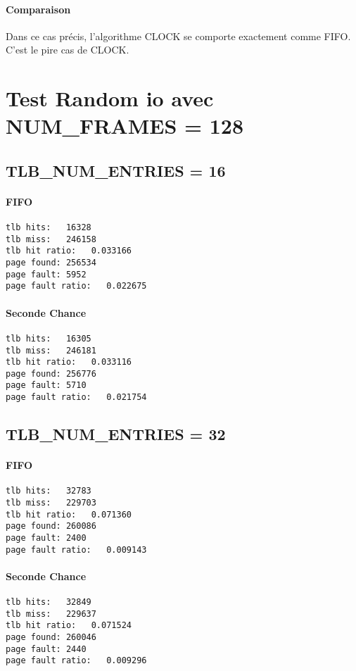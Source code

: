\documentclass{article}
\begin{document}
\paragraph{Comparaison}
Dans ce cas précis, l'algorithme CLOCK se comporte exactement comme FIFO.
C'est le pire cas de CLOCK.

\section*{Test Random io avec NUM\_FRAMES = 128}
\subsection*{TLB\_NUM\_ENTRIES = 16 }
\paragraph{FIFO}
\begin{lstlisting}
tlb hits:   16328
tlb miss:   246158
tlb hit ratio:   0.033166
page found: 256534
page fault: 5952
page fault ratio:   0.022675
\end{lstlisting}
\paragraph{Seconde Chance}
\begin{lstlisting}
tlb hits:   16305
tlb miss:   246181
tlb hit ratio:   0.033116
page found: 256776
page fault: 5710
page fault ratio:   0.021754
\end{lstlisting}

\subsection*{TLB\_NUM\_ENTRIES = 32}
\paragraph{FIFO}
\begin{lstlisting}
tlb hits:   32783
tlb miss:   229703
tlb hit ratio:   0.071360
page found: 260086
page fault: 2400
page fault ratio:   0.009143
\end{lstlisting}
\paragraph{Seconde Chance}
\begin{lstlisting}
tlb hits:   32849
tlb miss:   229637
tlb hit ratio:   0.071524
page found: 260046
page fault: 2440
page fault ratio:   0.009296


\end{lstlisting}
\end{document}
